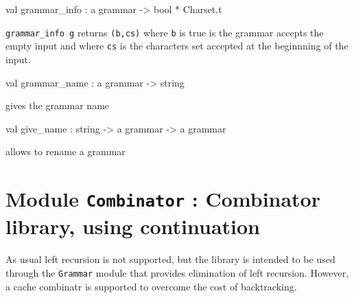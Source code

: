 \documentclass[11pt]{article}
\begin{document}
\label{val:Grammar.grammar-underscoreinfo}\begin{ocamldoccode}
val grammar_info : {\textquotesingle}a grammar -> bool * Charset.t
\end{ocamldoccode}
\begin{ocamldocdescription}
{\tt{grammar\_info g}} returns {\tt{(b,cs)}} where {\tt{b}} is true is the grammar accepts
    the empty input and where {\tt{cs}} is the characters set accepted at the beginnning
    of the input.


\end{ocamldocdescription}




\label{val:Grammar.grammar-underscorename}\begin{ocamldoccode}
val grammar_name : {\textquotesingle}a grammar -> string
\end{ocamldoccode}
\begin{ocamldocdescription}
gives the grammar name


\end{ocamldocdescription}




\label{val:Grammar.give-underscorename}\begin{ocamldoccode}
val give_name : string -> {\textquotesingle}a grammar -> {\textquotesingle}a grammar
\end{ocamldoccode}
\begin{ocamldocdescription}
allows to rename a grammar


\end{ocamldocdescription}


\section{Module {\tt{Combinator}} : Combinator library, using continuation}
\label{module:Combinator}



    As usual left recursion is not supported, but the library is intended to
    be used through the {\tt{Grammar}} module that provides elimination of left
    recursion. However, a cache combinatr is supported to overcome the cost
    of backtracking.



\ocamldocvspace{0.5cm}
\end{document}
